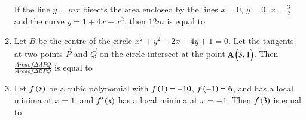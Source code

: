 \documentclass[journal]{IEEEtran}
\begin{document}
\begin{enumerate}
	If the line $y = mx$ bisects the area enclosed by the lines $x = 0$, $y = 0$, $x = \frac{3}{2}$ and the curve $y = 1 + 4x - x^{2}$, then $12m$ is equal to 
	\item 
	Let $B$ be the centre of the circle $x^2+ y^2 - 2x + 4y + 1 = 0$. Let the tangents at two points $\vec{P}$ and $\vec{Q}$ on the circle intersect at the point $\mathbf{A}\begin{pmatrix}3 , 1\end{pmatrix}$. Then $\frac{Area of \Delta APQ}{Area of \Delta BPQ}$ is equal to
	\item 
 	Let $f\left(x\right)$ be a cubic polynomial with $f\left(1\right) = -10$, $f\left(-1\right) = 6$, and has a local minima at $x = 1$, and $f^{\prime}\left(x\right)$ has a local minima at $x = -1$. Then $f\left(3\right)$ is equal to 
\end{enumerate}
\end{document}

